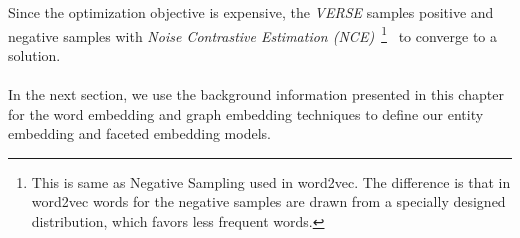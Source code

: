 Since the optimization objective is expensive, the \emph{VERSE} samples positive and negative samples with \emph{Noise Contrastive Estimation (NCE)}~\footnote{This is same as Negative Sampling used in word2vec. The difference is that in word2vec words for the negative samples are drawn from a specially designed distribution, which favors less frequent words.}~ to converge to a solution. \\
\\

In the next section, we use the background information presented in this chapter for the word embedding and graph embedding techniques to define our entity embedding and faceted embedding models. 
